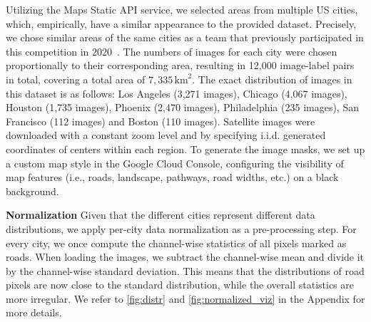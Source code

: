 \documentclass[10pt,conference,compsocconf]{IEEEtran}
\begin{document}
Utilizing the Maps Static API service, we selected areas from multiple US cities, which, empirically, have a similar appearance to the provided dataset. Precisely, we chose similar areas of the same cities as a team that previously participated in this competition in 2020~\cite{daniCh8-road-segmentation-eth-cil-2020}. The numbers of images for each city were chosen proportionally to their corresponding area, resulting in 12,000 image-label pairs in total, covering a total area of $7,335\, \mathrm{km}^2$. The exact distribution of images in this dataset is as follows: Los Angeles (3,271 images), Chicago (4,067 images), Houston (1,735 images), Phoenix (2,470 images), Philadelphia (235 images), San Francisco (112 images) and Boston (110 images). 
Satellite images were downloaded with a constant zoom level and by specifying i.i.d. generated coordinates of centers within each region. 
To generate the image masks, we set up a custom map style in the Google Cloud Console, configuring the visibility of map features (i.e., roads, landscape, pathways, road widths, etc.) on a black background.

\noindent\textbf{Normalization}
Given that the different cities represent different data distributions, we apply per-city data normalization as a pre-processing step. For every city, we once compute the channel-wise statistics of all pixels marked as roads. When loading the images, we subtract the channel-wise mean and divide it by the channel-wise standard deviation. This means that the distributions of road pixels are now close to the standard distribution, while the overall statistics are more irregular. We refer to \autoref{fig:distr} and \autoref{fig:normalized_viz} in the Appendix for more details.
\end{document}

